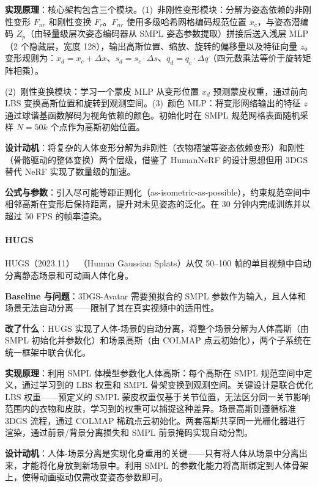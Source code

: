 \textbf{实现原理}：核心架构包含三个模块。(1)~非刚性变形模块：分解为姿态依赖的非刚性变形 $F_{nr}$ 和刚性变换 $F_r$。$F_{nr}$ 使用多级哈希网格编码规范位置 $x_c$，与姿态潜编码 $Z_p$（由轻量级层次姿态编码器从 SMPL 姿态参数提取）拼接后送入浅层 MLP（2 个隐藏层，宽度 128），输出高斯位置、缩放、旋转的偏移量以及特征向量 $z$。变形规则为：$x_d = x_c + \Delta x$、$s_d = s_c \cdot \Delta s$、$q_d = q_c \cdot \Delta q$（四元数乘法等价于旋转矩阵相乘）。

(2)~刚性变换模块：学习一个蒙皮 MLP 从变形位置 $x_d$ 预测蒙皮权重，通过前向 LBS 变换高斯位置和旋转到观测空间。(3)~颜色 MLP：将变形网络输出的特征 $z$ 通过球谐基函数解码为视角依赖的颜色。初始化时在 SMPL 规范网格表面随机采样 $N=50k$ 个点作为高斯初始位置。

\textbf{设计动机}：将复杂的人体变形分解为非刚性（衣物褶皱等姿态依赖变形）和刚性（骨骼驱动的整体变换）两个层级，借鉴了 HumanNeRF 的设计思想但用 3DGS 替代 NeRF 实现了数量级的加速。

\textbf{公式与参数}：引入尽可能等距正则化（as-isometric-as-possible），约束规范空间中相邻高斯在变形后保持距离，提升对未见姿态的泛化。在 30 分钟内完成训练并以超过 50 FPS 的帧率渲染。

\paragraph{HUGS}

HUGS（2023.11）~\cite{2311_17910}（Human Gaussian Splats）从仅 50--100 帧的单目视频中自动分离静态场景和可动画人体化身。

\textbf{Baseline 与问题}：3DGS-Avatar 需要预拟合的 SMPL 参数作为输入，且人体和场景无法自动分离——限制了其在真实视频中的适用性。

\textbf{改了什么}：HUGS 实现了人体-场景的自动分离，将整个场景分解为人体高斯（由 SMPL 初始化并参数化）和场景高斯（由 COLMAP 点云初始化），两个子系统在统一框架中联合优化。

\textbf{实现原理}：利用 SMPL 体模型参数化人体高斯：每个高斯在 SMPL 规范空间中定义，通过学习到的 LBS 权重和 SMPL 骨架变换到观测空间。关键设计是联合优化 LBS 权重——预定义的 SMPL 蒙皮权重仅基于关节位置，无法区分同一关节影响范围内的衣物和皮肤，学习到的权重可以捕捉这种差异。场景高斯则遵循标准 3DGS 流程，通过 COLMAP 稀疏点云初始化。两套高斯共享同一光栅化器进行渲染，通过前景/背景分离损失和 SMPL 前景掩码实现自动分割。

\textbf{设计动机}：人体-场景分离是实现化身重用的关键——只有将人体从场景中分离出来，才能将化身放到新场景中。利用 SMPL 的参数化能力将高斯绑定到人体骨架上，使得动画驱动仅需改变姿态参数即可。

